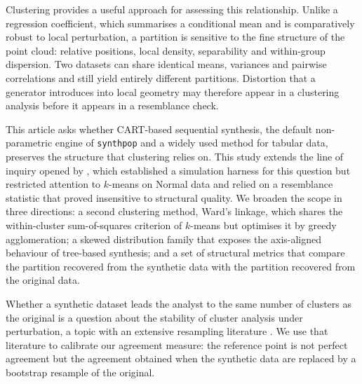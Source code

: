 \documentclass[pdflatex,referee]{sn-jnl}
\begin{document}
Clustering provides a useful approach for assessing this relationship. Unlike
a regression coefficient, which summarises a conditional mean and is
comparatively robust to local perturbation, a partition is sensitive to the
fine structure of the point cloud: relative positions, local density,
separability and within-group dispersion. Two datasets can share identical
means, variances and pairwise correlations and still yield entirely different
partitions. Distortion that a generator introduces into local geometry may
therefore appear in a clustering analysis before it appears in a resemblance
check.

This article asks whether CART-based sequential synthesis, the default
non-parametric engine of \texttt{synthpop} \citep{nowok2016} and a widely used
method for tabular data, preserves the structure that clustering relies on.
This study extends the line of inquiry opened by , which
established a simulation harness for this question but restricted attention to
$k$-means on Normal data and relied on a resemblance statistic that proved
insensitive to structural quality. We broaden the scope in three directions: a
second clustering method, Ward's linkage, which shares the within-cluster
sum-of-squares criterion of $k$-means but optimises it by greedy agglomeration;
a skewed distribution family that exposes the axis-aligned behaviour of
tree-based synthesis; and a set of structural metrics that compare the
partition recovered from the synthetic data with the partition recovered from
the original data.

Whether a synthetic dataset leads the analyst to the same number of clusters
as the original is a question about the stability of cluster analysis under
perturbation, a topic with an extensive resampling literature
\citep{benhur2002,dudoit2002,tibshirani2005,hennig2007,luxburg2010}. We use
that literature to calibrate our agreement measure: the reference point is not
perfect agreement but the agreement obtained when the synthetic data are
replaced by a bootstrap resample of the original.
\end{document}

